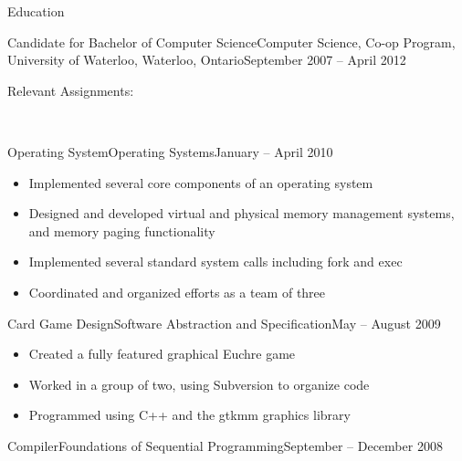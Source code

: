 \documentclass[11pt]{article}
\begin{document}
	\begin{section}{Education} \\

		\begin{subsection}{Candidate for Bachelor of Computer Science}{Computer Science, Co-op Program, University of Waterloo, Waterloo, Ontario}{September 2007 -- April 2012}

			\begin{indent}
				\begin{bf}Relevant Assignments:\end{bf} \\

                \begin{subsection}{Operating System}{Operating Systems}{January -- April 2010}

					\begin{itemize}
						\item Implemented several core components of an operating system
                        \item Designed and developed virtual and physical memory management systems, and memory paging functionality
                        \item Implemented several standard system calls including fork and exec
                        \item Coordinated and organized efforts as a team of three
					\end{itemize}

                \end{subsection}

				\begin{subsection}{Card Game Design}{Software Abstraction and Specification}{May -- August 2009}

					\begin{itemize}
						\item Created a fully featured graphical Euchre game
						\item Worked in a group of two, using Subversion to organize code
						\item Programmed using C++ and the gtkmm graphics library
					\end{itemize}

				\end{subsection}

				\begin{subsection}{Compiler}{Foundations of Sequential Programming}{September -- December 2008}


\end{subsection}
\end{indent}
\end{subsection}
\end{section}
\end{document}

